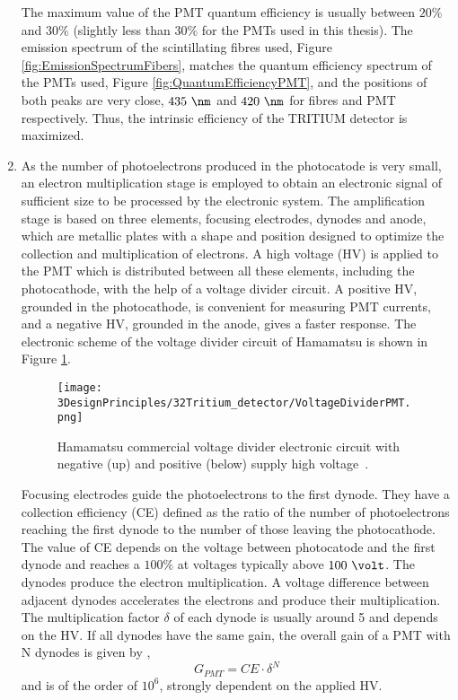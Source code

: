 \begin{enumerate}
The maximum value of the PMT quantum efficiency is usually between $20\%$ and $30\%$ \cite{Knoll} (slightly less than $30\%$ for the PMTs used in this thesis). The emission spectrum of the scintillating fibres used, Figure \ref{fig:EmissionSpectrumFibers}, matches the quantum efficiency spectrum of the PMTs used, Figure \ref{fig:QuantumEfficiencyPMT}, and the positions of both peaks are very close, $435~\nm$ and $420~\nm$ for fibres and PMT respectively. Thus, the intrinsic efficiency of the TRITIUM detector is maximized.

\item{} As the number of photoelectrons produced in the photocatode is very small, an electron multiplication stage is employed to obtain an electronic signal of sufficient size to be processed by the electronic system. The amplification stage is based on three elements, focusing electrodes, dynodes and anode, which are metallic plates with a shape and position designed to optimize the collection and multiplication of electrons. A high voltage (HV) is applied to the PMT which is distributed between all these elements, including the photocathode, with the help of a voltage divider circuit. A positive HV, grounded in the photocathode, is convenient for measuring PMT currents, and a negative HV, grounded in the anode, gives a faster response. The electronic scheme of the voltage divider circuit of Hamamatsu is shown in Figure \ref{fig:VoltageDividerCircuit}.

\begin{figure}[h]
\centering
\texttt{[image: 3DesignPrinciples/32Tritium\_detector/VoltageDividerPMT.png]}
\caption{Hamamatsu commercial voltage divider electronic circuit with negative (up) and positive (below) supply high voltage\label{fig:VoltageDividerCircuit}~\cite{DataSheetPMTs}.}
\end{figure}


Focusing electrodes guide the photoelectrons to the first dynode. They have a collection efficiency (CE) defined as the ratio of the number of photoelectrons reaching the first dynode to the number of those leaving the photocathode. The value of CE depends on the voltage between photocatode and the first dynode and reaches a $100\%$ at voltages typically above $100~\volt$. The dynodes produce the electron multiplication. A voltage difference between adjacent dynodes accelerates the electrons and produce their multiplication. The multiplication factor $\delta$ of each dynode is usually around 5 and depends on the HV. If all dynodes have the same gain, the overall gain of a PMT with N dynodes is given by \cite{Knoll},
\begin{equation}
G_{PMT} = CE\cdot{} \delta^N
\label{eq:PMTGain}
\end{equation}
and is of the order of $10^6$, strongly dependent on the applied HV.


\end{enumerate}
